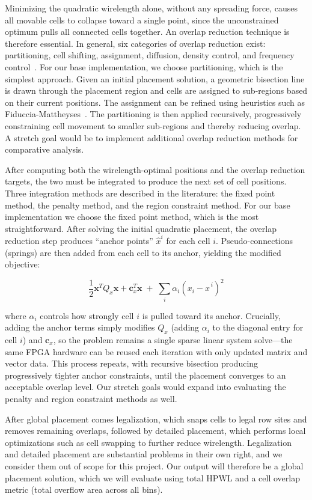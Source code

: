 \documentclass[conference]{IEEEtran}
\begin{document}
Minimizing the quadratic wirelength alone, without any spreading force, causes all movable cells to collapse toward a single point, since the unconstrained optimum pulls all connected cells together. An overlap reduction technique is therefore essential. In general, six categories of overlap reduction exist: partitioning, cell shifting, assignment, diffusion, density control, and frequency control~\cite{chang2007analytical}. For our base implementation, we choose partitioning, which is the simplest approach. Given an initial placement solution, a geometric bisection line is drawn through the placement region and cells are assigned to sub-regions based on their current positions. The assignment can be refined using heuristics such as Fiduccia-Mattheyses~\cite{chang2007analytical}. The partitioning is then applied recursively, progressively constraining cell movement to smaller sub-regions and thereby reducing overlap. A stretch goal would be to implement additional overlap reduction methods for comparative analysis.

After computing both the wirelength-optimal positions and the overlap reduction targets, the two must be integrated to produce the next set of cell positions. Three integration methods are described in the literature: the fixed point method, the penalty method, and the region constraint method. For our base implementation we choose the fixed point method, which is the most straightforward. After solving the initial quadratic placement, the overlap reduction step produces ``anchor points'' $\hat{x}^i$ for each cell $i$. Pseudo-connections (springs) are then added from each cell to its anchor, yielding the modified objective:

\[
\frac{1}{2}\mathbf{x}^T Q_x \mathbf{x} + \mathbf{c}_x^T \mathbf{x} \;+\; \sum_i \alpha_i \left(x_i - \hat{x}^{\,i}\right)^2
\]

where $\alpha_i$ controls how strongly cell $i$ is pulled toward its anchor. Crucially, adding the anchor terms simply modifies $Q_x$ (adding $\alpha_i$ to the diagonal entry for cell $i$) and $\mathbf{c}_x$, so the problem remains a single sparse linear system solve---the same FPGA hardware can be reused each iteration with only updated matrix and vector data. This process repeats, with recursive bisection producing progressively tighter anchor constraints, until the placement converges to an acceptable overlap level. Our stretch goals would expand into evaluating the penalty and region constraint methods as well.

After global placement comes legalization, which snaps cells to legal row sites and removes remaining overlaps, followed by detailed placement, which performs local optimizations such as cell swapping to further reduce wirelength. Legalization and detailed placement are substantial problems in their own right, and we consider them out of scope for this project. Our output will therefore be a global placement solution, which we will evaluate using total HPWL and a cell overlap metric (total overflow area across all bins).
\end{document}
